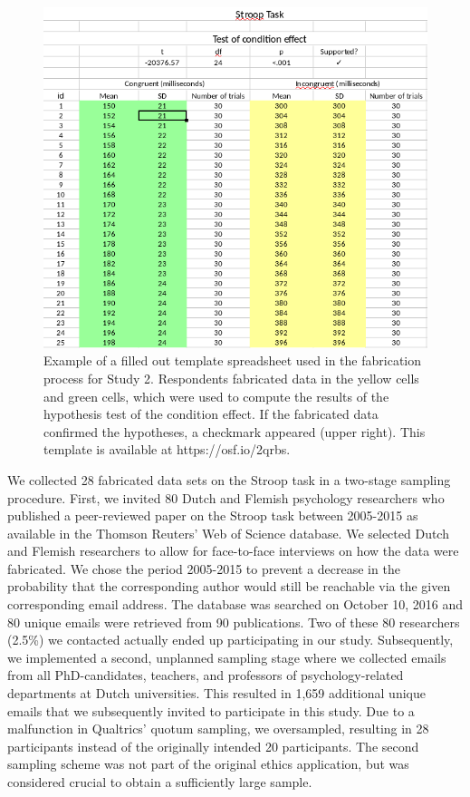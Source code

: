 \documentclass[a5paper]{book}
\begin{document}
\begin{figure}
\includegraphics[width=1\linewidth]{./assets/figures/spreadsheet2} \caption{Example of a filled out template spreadsheet used in the fabrication process for Study 2. Respondents fabricated data in the yellow cells and green cells, which were used to compute the results of the hypothesis test of the condition effect. If the fabricated data confirmed the hypotheses, a checkmark appeared (upper right). This template is available at https://osf.io/2qrbs.}\label{fig:spreadsheet-study2}
\end{figure}

We collected 28 fabricated data sets on the Stroop task in a two-stage
sampling procedure. First, we invited 80 Dutch and Flemish psychology
researchers who published a peer-reviewed paper on the Stroop task
between 2005-2015 as available in the Thomson Reuters' Web of Science
database. We selected Dutch and Flemish researchers to allow for
face-to-face interviews on how the data were fabricated. We chose the
period 2005-2015 to prevent a decrease in the probability that the
corresponding author would still be reachable via the given
corresponding email address. The database was searched on October 10,
2016 and 80 unique emails were retrieved from 90 publications. Two of
these 80 researchers (2.5\%) we contacted actually ended up
participating in our study. Subsequently, we implemented a second,
unplanned sampling stage where we collected emails from all
PhD-candidates, teachers, and professors of psychology-related
departments at Dutch universities. This resulted in 1,659 additional
unique emails that we subsequently invited to participate in this study.
Due to a malfunction in Qualtrics' quotum sampling, we oversampled,
resulting in 28 participants instead of the originally intended 20
participants. The second sampling scheme was not part of the original
ethics application, but was considered crucial to obtain a sufficiently
large sample.
\end{document}
